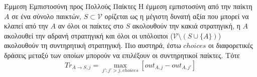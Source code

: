 {}
\begin{definitiongr}{Έμμεση Εμπιστοσύνη προς Πολλούς Παίκτες}
  Η έμμεση εμπιστοσύνη από την παίκτη $A$ σε ένα σύνολο παικτών, $S \subset \mathcal{V}$ ορίζεται ως η μέγιστη δυνατή αξία που
  μπορεί να κλαπεί από την $A$ αν όλοι οι παίκτες στο $S$ ακολουθούν την κακιά στρατηγική, η $A$ ακολουθεί την αδρανή
  στρατηγική και όλοι οι υπόλοιποι ($\mathcal{V} \setminus \left(S \cup \{A\}\right)$) ακολουθούν τη συντηρητική στρατηγική.
  Πιο αυστηρά, έστω $choices$ οι διαφορετικές δράσεις μεταξύ των οποίων μπορούν να επιλέξουν οι συντηρητικοί παίκτες. Τότε
  \begin{equation}
     Tr_{A \rightarrow S, j} = \max\limits_{j' : j' > j, choices}{\left[out_{A,j} - out_{A,j'}\right]}
  \end{equation}
\end{definitiongr}
